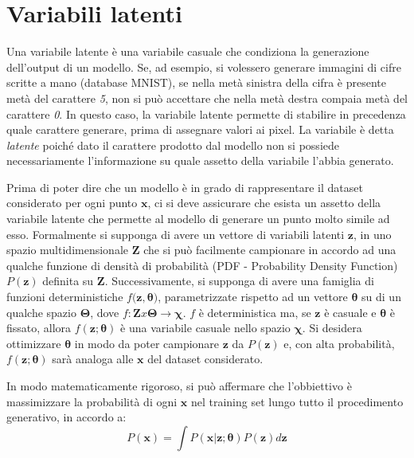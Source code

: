 \section{Variabili latenti} %
\label{sec:variabili_latenti}
Una variabile latente è una variabile casuale che condiziona la generazione dell'output di un modello. Se, ad esempio, si volessero generare immagini di cifre scritte a mano (database MNIST), se nella metà sinistra della cifra è presente metà del carattere \textit{5}, non si può accettare che nella metà destra compaia metà del carattere \textit{0}. In questo caso, la variabile latente permette di stabilire in precedenza quale carattere generare, prima di assegnare valori ai pixel. La variabile è detta \textit{latente} poiché dato il carattere prodotto dal modello non si possiede necessariamente l'informazione su quale assetto della variabile l'abbia generato. 

Prima di poter dire che un modello è in grado di rappresentare il dataset considerato per ogni punto $\boldsymbol{x}$, ci si deve assicurare che esista un assetto della variabile latente che permette al modello di generare un punto molto simile ad esso. Formalmente si supponga di avere un vettore di variabili latenti $\boldsymbol{z}$, in uno spazio multidimensionale $\boldsymbol{Z}$ che si può facilmente campionare in accordo ad una qualche funzione di densità di probabilità (PDF - Probability Density Function) $P(\boldsymbol{z})$ definita su $\boldsymbol{Z}$. Successivamente, si supponga di avere una famiglia di funzioni deterministiche $f(\boldsymbol{z}, \boldsymbol{\theta)}$, parametrizzate rispetto ad un vettore $\boldsymbol{\theta}$ su di un qualche spazio $\boldsymbol{\Theta}$, dove $f : \boldsymbol{Z} x \boldsymbol{\Theta} \rightarrow \boldsymbol{\chi}$. $f$ è deterministica ma, se $\boldsymbol{z}$ è casuale e $\boldsymbol{\theta}$ è fissato, allora $f(\boldsymbol{z}; \boldsymbol{\theta})$ è una variabile casuale nello spazio $\boldsymbol{\chi}$. Si desidera ottimizzare $\boldsymbol{\theta}$ in modo da poter campionare $\boldsymbol{z}$ da $P(\boldsymbol{z})$ e, con alta probabilità, $f(\boldsymbol{z}; \boldsymbol{\theta})$ sarà analoga alle $\boldsymbol{x}$ del dataset considerato.

In modo matematicamente rigoroso, si può affermare che l'obbiettivo è massimizzare la probabilità di ogni $\boldsymbol{x}$ nel training set lungo tutto il procedimento generativo, in accordo a:
\begin{equation}
	\label{probability}
	P(\boldsymbol{x}) = \int P(\boldsymbol{x} | \boldsymbol{z}; \boldsymbol{\theta}) P(\boldsymbol{z})d\boldsymbol{z}
\end{equation}

